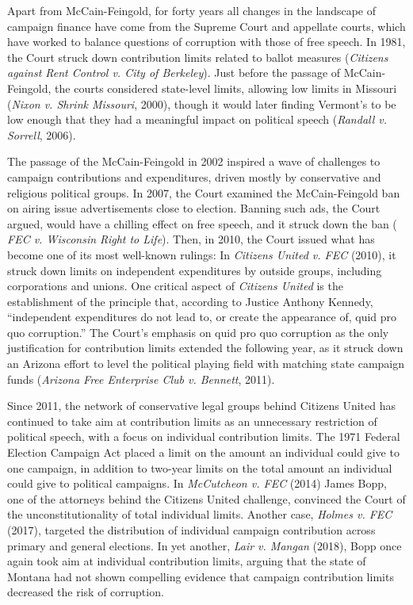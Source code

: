\documentclass{jopsubmission}
\begin{document}
Apart from McCain-Feingold, for forty years all changes in the landscape
of campaign finance have come from the Supreme Court and appellate
courts, which have worked to balance questions of corruption with those
of free speech. In 1981, the Court struck down contribution limits
related to ballot measures (\emph{Citizens against Rent Control v. City
of Berkeley}). Just before the passage of McCain-Feingold, the courts
considered state-level limits, allowing low limits in Missouri
(\emph{Nixon v. Shrink Missouri}, 2000), though it would later finding
Vermont's to be low enough that they had a meaningful impact on
political speech (\emph{Randall v. Sorrell}, 2006).

The passage of the McCain-Feingold in 2002 inspired a wave of challenges
to campaign contributions and expenditures, driven mostly by
conservative and religious political groups. In 2007, the Court examined
the McCain-Feingold ban on airing issue advertisements close to
election. Banning such ads, the Court argued, would have a chilling
effect on free speech, and it struck down the ban ( \emph{FEC v.
Wisconsin Right to Life}). Then, in 2010, the Court issued what has
become one of its most well-known rulings: In \emph{Citizens United v.
FEC} (2010), it struck down limits on independent expenditures by
outside groups, including corporations and unions. One critical aspect
of \emph{Citizens United} is the establishment of the principle that,
according to Justice Anthony Kennedy, ``independent expenditures do not
lead to, or create the appearance of, quid pro quo corruption.'' The
Court's emphasis on quid pro quo corruption as the only justification
for contribution limits extended the following year, as it struck down
an Arizona effort to level the political playing field with matching
state campaign funds (\emph{Arizona Free Enterprise Club v. Bennett},
2011).

Since 2011, the network of conservative legal groups behind Citizens
United has continued to take aim at contribution limits as an
unnecessary restriction of political speech, with a focus on individual
contribution limits. The 1971 Federal Election Campaign Act placed a
limit on the amount an individual could give to one campaign, in
addition to two-year limits on the total amount an individual could give
to political campaigns. In \emph{McCutcheon v. FEC} (2014) James Bopp,
one of the attorneys behind the Citizens United challenge, convinced the
Court of the unconstitutionality of total individual limits. Another
case, \emph{Holmes v. FEC} (2017), targeted the distribution of
individual campaign contribution across primary and general elections.
In yet another, \emph{Lair v. Mangan} (2018), Bopp once again took aim
at individual contribution limits, arguing that the state of Montana had
not shown compelling evidence that campaign contribution limits
decreased the risk of corruption.
\end{document}
